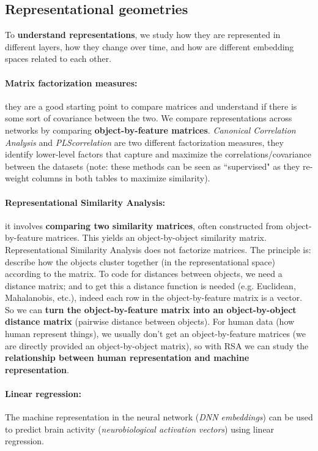 \subsection{Representational geometries}
To \textbf{understand representations}, we study how they are represented in different layers, how they change over time, and how are different embedding spaces related to each other.

\paragraph{Matrix factorization measures:} they are a good starting point to compare matrices and understand if there is some sort of covariance between the two. We compare representations across networks by comparing \textbf{object-by-feature matrices}. \textit{Canonical Correlation Analysis} and \textit{PLScorrelation} are two different factorization measures, they identify lower-level factors that capture and maximize the correlations/covariance between the datasets (note: these methods can be seen as ``supervised" as they re-weight columns in both tables to maximize similarity).

\paragraph{Representational Similarity Analysis:} it involves \textbf{comparing two similarity matrices}, often constructed from object-by-feature matrices. This yields an object-by-object similarity matrix.
Representational Similarity Analysis does not factorize matrices. The principle is: describe how the objects cluster together (in the representational space) according to the matrix. To code for distances between objects, we need a distance matrix; and to get this a distance function is needed (e.g. Euclidean, Mahalanobis, etc.), indeed each row in the object-by-feature matrix is a vector. So we can \textbf{turn the object-by-feature matrix into an object-by-object distance matrix} (pairwise distance between objects).
For human data (how human represent things), we usually don't get an object-by-feature matrices (we are directly provided an object-by-object matrix), so with RSA we can study the \textbf{relationship between human representation and machine representation}.

\paragraph{Linear regression:} The machine representation in the neural network (\textit{DNN embeddings}) can be used to predict brain activity (\textit{neurobiological activation vectors}) using linear regression.

